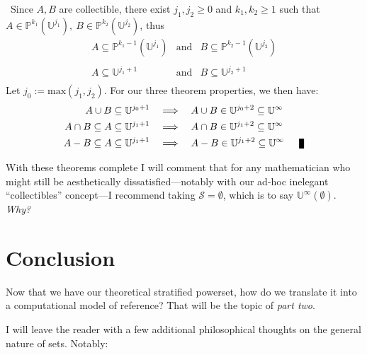 \documentclass[twoside]{article}
\newcommand{\nthps}[2][P]{\ensuremath{\mathbb{#1}^{#2}}}
\newcommand{\nthus}[2][U]{\ensuremath{\mathbb{#1}^{#2}}}
\newcommand{\stratified}{\ensuremath{\mathbb{U}^\infty}}
\newcommand{\of}[1]{\ensuremath{(\mathcal{#1})}}
\newcommand{\then}{\ensuremath{\quad\Longrightarrow\quad}}
\newenvironment{proof}[1][Proof]{\begin{trivlist}
\item[\hskip \labelsep {\bfseries #1}]}{\end{trivlist}}
\newcommand{\qed}{\nobreak \ifvmode \relax \else
      \ifdim\lastskip<1.5em \hskip-\lastskip
      \hskip1.5em plus0em minus0.5em \fi \nobreak
      \vrule height0.75em width0.5em depth0.25em\fi}
\begin{document}
\begin{proof}\
Since $ A,B $ are collectible, there exist $ j_1,j_2\ge 0 $ and $ k_1,k_2\ge 1 $ such that
$ A\in\nthps{k_1}(\nthus{j_1}),\ B\in\nthps{k_2}(\nthus{j_2}) $, thus
\begin{eqnarray*}
A\subseteq\nthps{k_1-1}(\nthus{j_1}) & \mbox{and} & B\subseteq\nthps{k_2-1}(\nthus{j_2}) \\
 & & \\
A\subseteq\nthus{j_1+1} & \mbox{and} & B\subseteq\nthus{j_2+1} \\
\end{eqnarray*}
\setcounter{equation}{0}
Let $ j_0:=\mbox{max}(j_1,j_2) $. For our three theorem properties, we then have:
\begin{align}
A\cup B\subseteq\nthus{j_0+1} & \then A\cup B\in\nthus{j_0+2}\subseteq\stratified \\
A\cap B\subseteq A\subseteq\nthus{j_1+1} & \then A\cap B\in\nthus{j_1+2}\subseteq\stratified \\
A-B\subseteq A\subseteq\nthus{j_1+1} & \then A-B\in\nthus{j_1+2}\subseteq\stratified\qed
\end{align}
\end{proof}
With these theorems complete I will comment that for any mathematician who might still be aesthetically
dissatisfied---notably with our ad-hoc inelegant ``collectibles'' concept---I recommend taking
$ \mathcal{S}=\emptyset $, which is to say $ \stratified\of{\emptyset} $. \emph{Why?}

\section*{Conclusion}

Now that we have our theoretical stratified powerset, how do we translate it into a computational model of reference?
That will be the topic of \emph{part two}.

I will leave the reader with a few additional philosophical thoughts on the general nature of sets. Notably:
\end{document}
